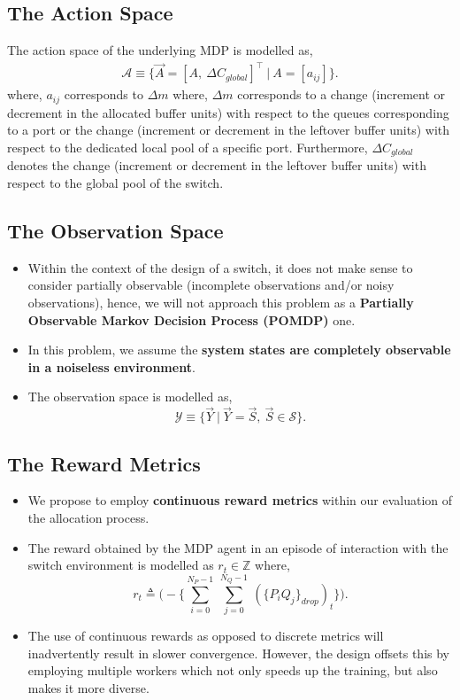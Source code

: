 \documentclass{article}
\begin{document}
\subsection{The Action Space}
The action space of the underlying MDP is modelled as,
\begin{equation}
    \begin{aligned}
        \mathcal{A} \equiv \{\vec{A} = [A,\ \Delta C_{global}]^\intercal\ |\ A = [a_{ij}]\}.
    \end{aligned}
\end{equation}
where, $a_{ij}$ corresponds to $\Delta m$ where, $\Delta m$ corresponds to a change (increment or decrement in the allocated buffer units) with respect to the queues corresponding to a port or the change (increment or decrement in the leftover buffer units) with respect to the dedicated local pool of a specific port. Furthermore, $\Delta C_{global}$ denotes the change (increment or decrement in the leftover buffer units) with respect to the global pool of the switch.
\subsection{The Observation Space}
\begin{itemize}
    \item Within the context of the design of a switch, it does not make sense to consider partially observable (incomplete observations and/or noisy observations), hence, we will not approach this problem as a \textbf{Partially Observable Markov Decision Process (POMDP)} one.
    \item In this problem, we assume the \textbf{system states are completely observable in a noiseless environment}.
    \item The observation space is modelled as,
    \begin{equation}
        \mathcal{Y} \equiv \{\vec{Y}\ |\ \vec{Y} = \vec{S},\ \vec{S} \in \mathcal{S}\}.
    \end{equation}
\end{itemize}
\subsection{The Reward Metrics}
\begin{itemize}
    \item We propose to employ \textbf{continuous reward metrics} within our evaluation of the allocation process.
    \item The reward obtained by the MDP agent in an episode of interaction with the switch environment is modelled as $r_t \in \mathbb{Z}$ where,
    \begin{equation}
        r_{t} \triangleq \Big(- \Big\{\sum_{i=0}^{N_P-1}\ \sum_{j=0}^{N_Q-1}\ (\{P_i Q_j\}_{drop})_t\Big\}\Big).
    \end{equation}
    \item The use of continuous rewards as opposed to discrete metrics will inadvertently result in slower convergence. However, the design offsets this by employing multiple workers which not only speeds up the training, but also makes it more diverse.
\end{itemize}
\end{document}
